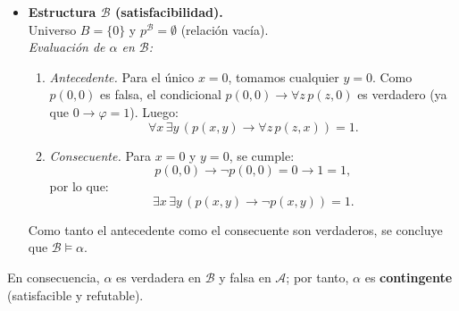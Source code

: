 \documentclass[12pt]{article}
\begin{document}
\begin{ejercicio}
\begin{itemize}
    \item \textbf{Estructura $\mathcal{B}$ (satisfacibilidad).}\\
    Universo $B = \{0\}$ y $p^{\mathcal{B}} = \emptyset$ (relación vacía).\\[2mm]
    \emph{Evaluación de $\alpha$ en $\mathcal{B}$:}
    \begin{enumerate}
        \item \emph{Antecedente.} Para el único $x = 0$, tomamos cualquier $y = 0$. Como $p(0,0)$ es falsa, el condicional $p(0,0) \rightarrow \forall z\,p(z,0)$ es verdadero (ya que $0 \rightarrow \varphi = 1$). Luego:
        \[
        \forall x\,\exists y\,(p(x,y)\rightarrow\forall z\,p(z,x)) = 1.
        \]
        \item \emph{Consecuente.} Para $x = 0$ y $y = 0$, se cumple:
        \[
        p(0,0)\rightarrow\neg p(0,0) = 0 \rightarrow 1 = 1,
        \]
        por lo que:
        \[
        \exists x\,\exists y\,(p(x,y)\rightarrow\neg p(x,y)) = 1.
        \]
    \end{enumerate}
    Como tanto el antecedente como el consecuente son verdaderos, se concluye que \emph{$\mathcal{B} \models \alpha$}.
\end{itemize}

En consecuencia, $\alpha$ es verdadera en $\mathcal{B}$ y falsa en $\mathcal{A}$; por tanto, $\alpha$ es \textbf{contingente} (satisfacible y refutable).
\end{ejercicio}
\end{document}
